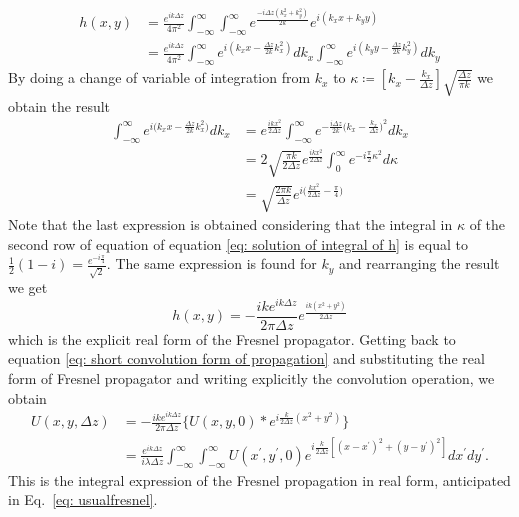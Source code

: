 \documentclass{iucr}              %
\begin{document}
\begin{align}\label{eq: explicit form of h}
h(x,y) &= \frac{e^{i k \Delta z}}{4\pi^2} \int_{-\infty}^{\infty}\int_{-\infty}^{\infty} e^{\frac{-i \Delta z (k_x^2 + k_y^2) }{2k}} e^{i (k_xx + k_yy)} \nonumber\\ 
&=\frac{e^{i k \Delta z}}{4\pi^2} \int_{-\infty}^{\infty} e^{i(k_xx - \frac{\Delta z}{2k}k_x^2) }dk_x\int_{-\infty}^{\infty} e^{i(k_yy - \frac{\Delta z}{2k}k_y^2) }dk_y
\end{align} 
By doing a change of variable of integration from $k_x$ to $\kappa \coloneqq [k_x - \frac{k_x}{\Delta z}]\sqrt{\frac{\Delta z}{\pi k}}$ we obtain the result
\begin{align}\label{eq: solution of integral of h}
\int_{-\infty}^{\infty} e^{i\big(k_xx - \frac{\Delta z}{2k}k_x^2\big) }dk_x &= e^{\frac{ikx^2}{2\Delta z}}\int_{-\infty}^{\infty} e^{-\frac{i \Delta z}{2k} \big(k_x - \frac{k_x}{\Delta z}\big)^2}dk_x \nonumber\\
&= 2 \sqrt{\frac{\pi k }{2 \Delta z}} e^{\frac{ikx^2}{2\Delta z}} \int_{0}^{\infty}e^{-i\frac{\pi}{2}\kappa^2}d\kappa \nonumber \\
&= \sqrt{\frac{2\pi k}{\Delta z}}e^{i\big(\frac{kx^2}{2\Delta z}-\frac{\pi}{4}\big)}
\end{align} 
Note that the last expression is obtained considering that the integral in $\kappa$ of the second row of equation  of equation \ref{eq: solution of integral of h} is equal to $\frac{1}{2}(1-i) = \frac{e^{-i\frac{\pi}{4}}}{\sqrt{2}}$. The same expression is found for $k_y$ and rearranging the result we get
\begin{equation}\label{eq: real space Fresnel propagator}
h(x,y) = -\frac{ike^{ik\Delta z}}{2\pi \Delta z} e^{\frac{ik(x^2+y^2)}{2\Delta z}}
\end{equation}
which is the explicit real form of the Fresnel propagator. Getting back to equation \ref{eq: short convolution form of propagation} and substituting the real form of Fresnel propagator and writing explicitly the convolution operation, we obtain
\begin{align}\label{eq: explicit form of convolution integral for propagation}
U(x,y, \Delta z) &= -\frac{ike^{ik\Delta z}}{2\pi \Delta z} \Big\{U(x,y, 0)* e^{i \frac{k}{2\Delta z}(x^2+y^2)}\Big\} \nonumber \\
&= \frac {e^{ik\Delta z }}{ i \lambda \Delta z} \int_{-\infty}^{\infty} \int_{-\infty}^{\infty}U(x^\prime, y^\prime, 0) e^{i \frac{k}{2 \Delta z} [(x - x^\prime)^2 + (y - y^\prime)^2]} dx^\prime dy^\prime.
\end{align}
This is the integral expression of the Fresnel propagation in real form, anticipated in Eq.~\ref{eq: usualfresnel}. 
\end{document}
